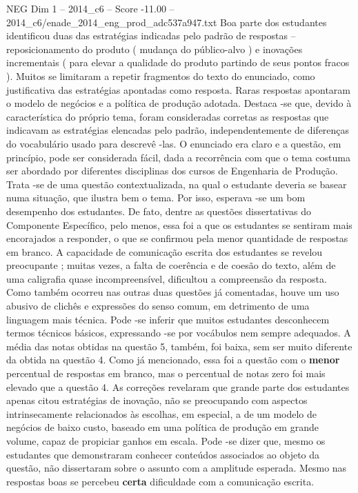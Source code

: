 \begin{textsample}{NEG Dim 1 – 2014\_c6 – Score -11.00 – 2014\_c6/enade\_2014\_eng\_prod\_adc537a947.txt}
Boa parte dos estudantes identificou duas das estratégias indicadas pelo padrão de respostas – reposicionamento do produto ( mudança do público-alvo ) e inovações incrementais ( para elevar a qualidade do produto partindo de seus pontos fracos ).
Muitos se limitaram a repetir fragmentos do texto do enunciado, como justificativa das estratégias apontadas como resposta.
Raras respostas apontaram o modelo de negócios e a política de produção adotada.
Destaca -se que, devido à característica do próprio tema, foram consideradas corretas as respostas que indicavam as estratégias elencadas pelo padrão, independentemente de diferenças do vocabulário usado para descrevê -las.
O enunciado era claro e a questão, em princípio, pode ser considerada fácil, dada a recorrência com que o tema costuma ser abordado por diferentes disciplinas dos cursos de Engenharia de Produção.
Trata -se de uma questão contextualizada, na qual o estudante deveria se basear numa situação, que ilustra bem o tema.
Por isso, esperava -se um bom desempenho dos estudantes.
De fato, dentre as questões dissertativas do Componente Específico, pelo menos, essa foi a que os estudantes se sentiram mais encorajados a responder, o que se confirmou pela menor quantidade de respostas em branco.
A capacidade de comunicação escrita dos estudantes se revelou preocupante ; muitas vezes, a falta de coerência e de coesão do texto, além de uma caligrafia quase incompreensível, dificultou a compreensão da resposta.
Como também ocorreu nas outras duas questões já comentadas, houve um uso abusivo de clichês e expressões do senso comum, em detrimento de uma linguagem mais técnica.
Pode -se inferir que muitos estudantes desconhecem termos técnicos básicos, expressando -se por vocábulos nem sempre adequados.
A média das notas obtidas na questão 5, também, foi baixa, sem ser muito diferente da obtida na questão 4.
Como já mencionado, essa foi a questão com o \textbf{menor} percentual de respostas em branco, mas o percentual de notas zero foi mais elevado que a questão 4.
As correções revelaram que grande parte dos estudantes apenas citou estratégias de inovação, não se preocupando com aspectos intrinsecamente relacionados às escolhas, em especial, a de um modelo de negócios de baixo custo, baseado em uma política de produção em grande volume, capaz de propiciar ganhos em escala.
Pode -se dizer que, mesmo os estudantes que demonstraram conhecer conteúdos associados ao objeto da questão, não dissertaram sobre o assunto com a amplitude esperada.
Mesmo nas respostas boas se percebeu \textbf{certa} dificuldade com a comunicação escrita.

\end{textsample}

